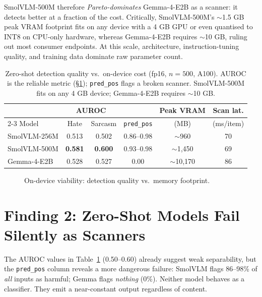 \documentclass[sigconf,nonacm]{acmart}
\begin{document}
SmolVLM-500M therefore \emph{Pareto-dominates} Gemma-4-E2B as a scanner: it detects better
at a fraction of the cost. Critically, SmolVLM-500M's $\sim$1.5 GB peak VRAM footprint fits
on any device with a 4 GB GPU or even quantised to INT8 on CPU-only hardware, whereas
Gemma-4-E2B requires $\sim$10 GB, ruling out most consumer endpoints. At this scale,
architecture, instruction-tuning quality, and training data dominate raw parameter count.

\begin{table}[t]
\centering
\caption{Zero-shot detection quality vs.\ on-device cost (fp16, $n{=}500$, A100). AUROC is
the reliable metric (\S\ref{sec:collapse}); \texttt{pred\_pos} flags a broken scanner.
SmolVLM-500M fits on any 4 GB device; Gemma-4-E2B requires $\sim$10 GB.}
\label{tab:zs}
\begin{tabular}{lccccc}
\toprule
& \multicolumn{2}{c}{AUROC} & & Peak VRAM & Scan lat. \\
\cmidrule(lr){2-3}
Model & Hate & Sarcasm & \texttt{pred\_pos} & (MB) & (ms/item) \\
\midrule
SmolVLM-256M & 0.513 & 0.502 & 0.86--0.98 & \(\sim\)960  & 70 \\
SmolVLM-500M & \textbf{0.581} & \textbf{0.600} & 0.93--0.98 & \(\sim\)1{,}450 & 69 \\
Gemma-4-E2B  & 0.528 & 0.527 & 0.00        & \(\sim\)10{,}170 & 86 \\
\bottomrule
\end{tabular}
\end{table}

\begin{figure}[t]
\centering
{}
\caption{On-device viability: detection quality vs.\ memory footprint.}
\label{fig:pareto}
\end{figure}

\section{Finding 2: Zero-Shot Models Fail Silently as Scanners}\label{sec:collapse}
The AUROC values in Table~\ref{tab:zs} (0.50--0.60) already suggest weak separability, but
the \texttt{pred\_pos} column reveals a more dangerous failure: SmolVLM flags 86--98\% of
\emph{all} inputs as harmful; Gemma flags \emph{nothing} (0\%). Neither model behaves as a
classifier. They emit a near-constant output regardless of content.
\end{document}
